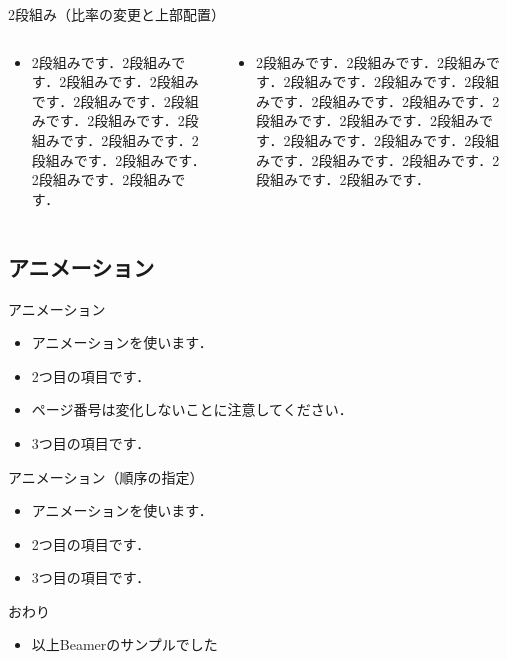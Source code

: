 \begin{frame}{2段組み（比率の変更と上部配置）}
  \begin{columns}[t]
    \begin{column}{0.3\textwidth}
      \begin{itemize}
        \item 2段組みです．2段組みです．2段組みです．2段組みです．2段組みです．2段組みです．2段組みです．2段組みです．2段組みです．2段組みです．2段組みです．2段組みです．2段組みです．
      \end{itemize}
    \end{column}
    \begin{column}{0.7\textwidth}
      \begin{itemize}
        \item 2段組みです．2段組みです．2段組みです．2段組みです．2段組みです．2段組みです．2段組みです．2段組みです．2段組みです．2段組みです．2段組みです．2段組みです．2段組みです．2段組みです．2段組みです．2段組みです．2段組みです．2段組みです．
      \end{itemize}
    \end{column}
  \end{columns}
\end{frame}

\subsection{アニメーション}

\begin{frame}{アニメーション}
  \begin{itemize}
    \item アニメーションを使います．
    \pause
    \item 2つ目の項目です．
    \item ページ番号は変化しないことに注意してください．
    \pause
    \item 3つ目の項目です．
  \end{itemize}
\end{frame}

\begin{frame}{アニメーション（順序の指定）}
  \begin{itemize}
    \item<1-> アニメーションを使います．
    \item<3-> 2つ目の項目です．
    \item<2-> 3つ目の項目です．
  \end{itemize}
\end{frame}

\begin{frame}{おわり}
  \begin{itemize}
    \item 以上Beamerのサンプルでした
  \end{itemize}
\end{frame}
